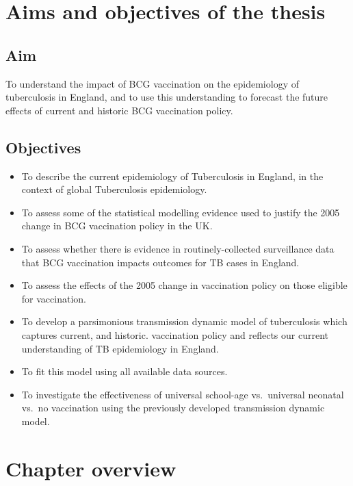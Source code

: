 \documentclass[11pt,twoside]{bristolthesis}
\providecommand{\tightlist}{%
  \setlength{\itemsep}{0pt}\setlength{\parskip}{0pt}}
\begin{document}
  \hypertarget{aims-and-objectives-of-the-thesis}{%
  \section{Aims and objectives of the thesis}\label{aims-and-objectives-of-the-thesis}}
  
  \hypertarget{aim}{%
  \subsection{Aim}\label{aim}}
  
  To understand the impact of BCG vaccination on the epidemiology of tuberculosis in England, and to use this understanding to forecast the future effects of current and historic BCG vaccination policy.
  
  \hypertarget{objectives}{%
  \subsection{Objectives}\label{objectives}}
  \begin{itemize}
  \tightlist
  \item
    To describe the current epidemiology of Tuberculosis in England, in the context of global Tuberculosis epidemiology.
  \item
    To assess some of the statistical modelling evidence used to justify the 2005 change in BCG vaccination policy in the UK.
  \item
    To assess whether there is evidence in routinely-collected surveillance data that BCG vaccination impacts outcomes for TB cases in England.
  \item
    To assess the effects of the 2005 change in vaccination policy on those eligible for vaccination.
  \item
    To develop a parsimonious transmission dynamic model of tuberculosis which captures current, and historic. vaccination policy and reflects our current understanding of TB epidemiology in England.
  \item
    To fit this model using all available data sources.
  \item
    To investigate the effectiveness of universal school-age vs.~universal neonatal vs.~no vaccination using the previously developed transmission dynamic model.
  \end{itemize}
  \hypertarget{chapter-overview}{%
  \section{Chapter overview}\label{chapter-overview}}
\end{document}

